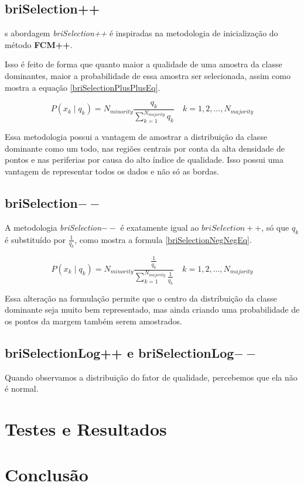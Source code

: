 \documentclass[]{article}
\begin{document}
	\subsection{briSelection++} 
	s abordagem \textit{briSelection++} é inspiradas na metodologia de inicialização do método \textbf{FCM++}.
	
	Isso é feito de forma que quanto maior a qualidade de uma amostra da classe dominantes, maior a probabilidade de essa amostra ser selecionada, assim como mostra a equação \ref{briSelectionPlusPlusEq}.
	
	\begin{equation}
	\label{briSelectionPlusPlusEq}
	P(x_k\mid q_k) = N_{minority} \frac{q_k}{\sum_{k = 1}^{N_{majority}} q_k}  \quad k = 1,2,...,N_{majority}
	\end{equation}
	
	Essa metodologia possui a vantagem de amostrar a distribuição da classe dominante como um todo, nas regiões centrais por conta da alta densidade de pontos e nas periferias por causa do alto índice de qualidade. Isso possui uma vantagem de representar todos os dados e não só as bordas.
	
	\subsection{briSelection$--$} 
	A metodologia \textit{briSelection$--$} é exatamente igual ao \textit{$briSelection++$}, só que $q_k$ é substituído por $\frac{1}{q_k}$, como mostra a formula \ref{briSelectionNegNegEq}.
	
		\begin{equation}
		\label{briSelectionNegNegEq}
		P(x_k\mid q_k) = N_{minority} \frac{\frac{1}{q_k}}{\sum_{k = 1}^{N_{majority}} \frac{1}{q_k}}  \quad k = 1,2,...,N_{majority}
		\end{equation}
		
	Essa alteração na formulação permite que o centro da distribuição da classe dominante seja muito bem representado, mas ainda criando uma probabilidade de os pontos da margem também serem amostrados.
	
	\subsection{briSelectionLog++ e briSelectionLog$--$} 
	Quando observamos a distribuição do fator de qualidade, percebemos que ela não é normal.
		
	
	\section{Testes e Resultados}
	
	
	\section{Conclusão}
	
	
\end{document}
